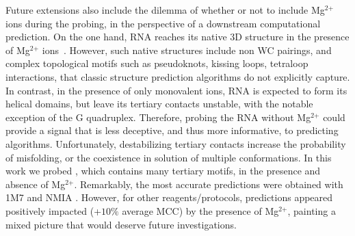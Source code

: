 \documentclass[a4,center,fleqn]{NAR}
\begin{document}
Future extensions also include  the dilemma of whether or not to include Mg$^{\text{2+}}$ ions during the probing, in the perspective of a downstream computational prediction. On the one hand, RNA reaches its native 3D structure in the presence of Mg$^{\text{2+}}$ ions~\cite{Knapp1989}. However, such native structures include non WC pairings, and complex topological motifs such as pseudoknots, kissing loops, tetraloop interactions, that classic structure prediction algorithms do not explicitly capture. In contrast, in the presence of only monovalent ions, RNA is expected to form its helical domains, but leave its  tertiary contacts unstable, with the notable exception of the G quadruplex. Therefore, probing the RNA without Mg$^{\text{2+}}$ could provide a signal that is less deceptive, and thus more informative, to predicting algorithms. Unfortunately, destabilizing tertiary contacts increase the probability of misfolding, or the coexistence in solution of multiple conformations. In this work we probed \didy, which contains many tertiary motifs, in the presence and absence of Mg$^{\text{2+}}$. Remarkably, the most accurate predictions were obtained with 1M7 and NMIA . However, for other reagents/protocols, predictions appeared positively impacted (+$10\%$ average MCC) by the presence of Mg$^{\text{2+}}$, painting a mixed picture that would deserve future investigations.
\end{document}
